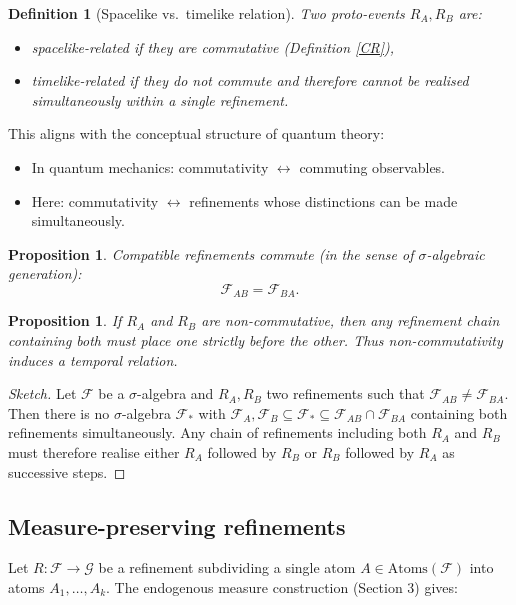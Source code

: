 \documentclass[
 amsmath,amssymb,
  onecolumn %
]{revtex4-2}
\newtheorem{proposition}[theorem]{Proposition}
\newtheorem{definition}[theorem]{Definition}
\begin{document}
\begin{definition}[Spacelike vs.\ timelike relation]
Two proto-events $R_A, R_B$ are:
\begin{itemize}[leftmargin=2em]
\item \emph{spacelike-related} if they are commutative (Definition \ref{CR}),
\item \emph{timelike-related} if they do not commute and therefore cannot
be realised simultaneously within a single refinement.
\end{itemize}
\end{definition}
This aligns with the conceptual structure of quantum theory:
\begin{itemize}
\item	In quantum mechanics: commutativity $\leftrightarrow$ commuting observables.
\item	Here: commutativity $\leftrightarrow$ refinements whose distinctions can be made simultaneously.
\end{itemize}
\begin{proposition}
Compatible refinements commute (in the sense of $\sigma$-algebraic generation):
$$
\mathcal{F}_{AB} = \mathcal{F}_{BA}.
$$
\end{proposition}
\begin{proposition}
If $R_A$ and $R_B$ are non-commutative, then any refinement chain containing both must place one strictly before the other.  Thus non-commutativity induces a temporal relation.
\end{proposition}
\begin{proof}[Sketch]
Let $\mathcal F$ be a $\sigma$-algebra and $R_A,R_B$ two refinements such that
$\mathcal F_{AB}\neq \mathcal F_{BA}$.
Then there is no $\sigma$-algebra $\mathcal F_*$
with $\mathcal F_A,\mathcal F_B\subseteq \mathcal F_*\subseteq \mathcal F_{AB}\cap\mathcal F_{BA}$
containing both refinements simultaneously.
Any chain of refinements including both $R_A$ and $R_B$ must therefore realise
either $R_A$ followed by $R_B$ or $R_B$ followed by $R_A$ as successive steps.
\end{proof}


\subsection{Measure-preserving refinements} 
Let $R: \mathcal{F} \to \mathcal{G}$ be a refinement subdividing a single atom 
$A \in \mathrm{Atoms}(\mathcal{F})$ into atoms $A_1,\dots, A_k$.
The endogenous measure construction (Section 3) gives:
\end{document}
